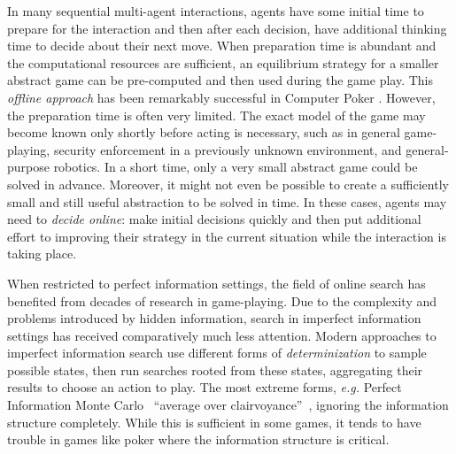 \documentclass[letterpaper]{article}
\newcommand{\eg}{{\it e.g.}\xspace}
\begin{document}
In many sequential multi-agent interactions, agents have some initial time to prepare for the interaction and then after each decision, have  additional thinking time to decide about their next move. When preparation time is abundant and the computational resources are sufficient, an equilibrium strategy for a smaller abstract game can be pre-computed and then used during the game play. This {\it offline approach} has been remarkably successful in 
Computer Poker \cite{Sandholm10The,Rubin10Poker,Gilpin09,Johanson07Msc}.
However, the preparation time is often very limited. The exact model of the game may become known only shortly before acting is necessary, such as in general game-playing, security enforcement in a previously unknown environment, and general-purpose robotics. In a short time, only a very small abstract game could be solved in advance. Moreover, it might not even be possible to create a sufficiently small and still useful abstraction to be solved in time. In these cases, agents may need to {\it decide online}: make initial decisions quickly and then put additional effort to improving their strategy in the current situation while the interaction is taking place.

When restricted to perfect information settings, the field of online search has benefited from decades of research in game-playing. 
Due to the complexity and problems introduced by hidden information, search in imperfect information settings has received comparatively much less attention.
Modern approaches to imperfect information search use different forms of {\it determinization} to sample possible states, then run 
searches rooted from these states, aggregating their results to choose an action to play. The most extreme forms, \eg Perfect Information 
Monte Carlo~\cite{Long10Understanding} ``average over clairvoyance''~\cite{AIBook},
ignoring the information structure completely. While this is sufficient in some games, it tends to have trouble in games like poker 
where the information structure is critical.

\end{document}
